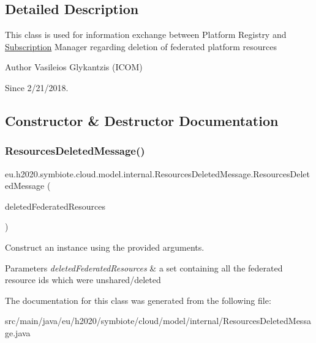 \subsection{Detailed Description}
This class is used for information exchange between Platform Registry and \hyperlink{classeu_1_1h2020_1_1symbiote_1_1cloud_1_1model_1_1internal_1_1Subscription}{Subscription} Manager regarding deletion of federated platform resources

\begin{DoxyAuthor}{Author}
Vasileios Glykantzis (I\+C\+OM) 
\end{DoxyAuthor}
\begin{DoxySince}{Since}
2/21/2018. 
\end{DoxySince}


\subsection{Constructor \& Destructor Documentation}
\mbox{\label{classeu_1_1h2020_1_1symbiote_1_1cloud_1_1model_1_1internal_1_1ResourcesDeletedMessage_af4925b3c3a25515739730f07478a04b3}} 
\subsubsection{\texorpdfstring{Resources\+Deleted\+Message()}{ResourcesDeletedMessage()}}
{\footnotesize\ttfamily eu.\+h2020.\+symbiote.\+cloud.\+model.\+internal.\+Resources\+Deleted\+Message.\+Resources\+Deleted\+Message (\begin{DoxyParamCaption}\item[{@Json\+Property(\char`\"{}deleted\+Federated\+Resources\char`\"{}) Set$<$ String $>$}]{deleted\+Federated\+Resources }\end{DoxyParamCaption})}

Construct an instance using the provided arguments.


\begin{DoxyParams}{Parameters}
{\em deleted\+Federated\+Resources} & a set containing all the federated resource ids which were unshared/deleted \\
\hline
\end{DoxyParams}


The documentation for this class was generated from the following file\+:\begin{DoxyCompactItemize}
\item 
src/main/java/eu/h2020/symbiote/cloud/model/internal/Resources\+Deleted\+Message.\+java\end{DoxyCompactItemize}
